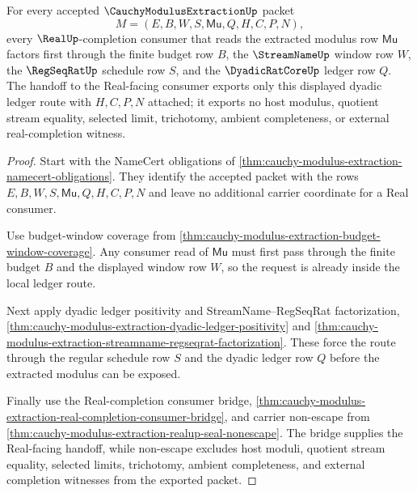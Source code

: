 \begin{theorem}
\label{thm:cauchy-modulus-extraction-dyadic-real-consumer-factorization}
For every accepted $\CauchyModulusExtractionUp$ packet
$$
M=(E,B,W,S,\mathsf{Mu},Q,H,C,P,N),
$$
every $\RealUp$-completion consumer that reads the extracted modulus row $\mathsf{Mu}$ factors first through the finite budget row $B$, the $\StreamNameUp$ window row $W$, the $\RegSeqRatUp$ schedule row $S$, and the $\DyadicRatCoreUp$ ledger row $Q$. The handoff to the Real-facing consumer exports only this displayed dyadic ledger route with $H,C,P,N$ attached; it exports no host modulus, quotient stream equality, selected limit, trichotomy, ambient completeness, or external real-completion witness.
\end{theorem}
\begin{proof}
Start with the NameCert obligations of \autoref{thm:cauchy-modulus-extraction-namecert-obligations}. They identify the accepted packet with the rows $E,B,W,S,\mathsf{Mu},Q,H,C,P,N$ and leave no additional carrier coordinate for a Real consumer.

Use budget-window coverage from \autoref{thm:cauchy-modulus-extraction-budget-window-coverage}. Any consumer read of $\mathsf{Mu}$ must first pass through the finite budget $B$ and the displayed window row $W$, so the request is already inside the local ledger route.

Next apply dyadic ledger positivity and StreamName--RegSeqRat factorization, \autoref{thm:cauchy-modulus-extraction-dyadic-ledger-positivity} and \autoref{thm:cauchy-modulus-extraction-streamname-regseqrat-factorization}. These force the route through the regular schedule row $S$ and the dyadic ledger row $Q$ before the extracted modulus can be exposed.

Finally use the Real-completion consumer bridge, \autoref{thm:cauchy-modulus-extraction-real-completion-consumer-bridge}, and carrier non-escape from \autoref{thm:cauchy-modulus-extraction-realup-seal-nonescape}. The bridge supplies the Real-facing handoff, while non-escape excludes host moduli, quotient stream equality, selected limits, trichotomy, ambient completeness, and external completion witnesses from the exported packet.
\end{proof}

